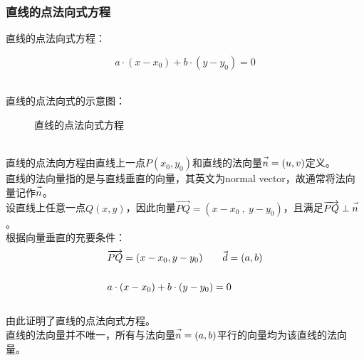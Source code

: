 \documentclass[UTF8]{ctexart}
\let\nvec\vec
\def\vec#1{\nvec{\vphantom b\smash{#1}}}
\begin{document}
\subsubsection{直线的点法向式方程}
    \setcounter{equation}{0}
    直线的点法向式方程：
    \begin{large}
        \begin{equation*}
            a\cdot(x-x_0)+b\cdot(y-y_0)=0
        \end{equation*}
    \end{large}\\
    直线的点法向式的示意图：
    \begin{figure}[h]
        \begin{center}
            \caption{直线的点法向式方程}
        \end{center}
    \end{figure}\\
    直线的点法向方程由直线上一点$P(x_0,y_0)$和直线的法向量$\vec{n}=(u,v)$定义。\\[3mm]
    直线的法向量指的是与直线垂直的向量，其英文为normal vector，故通常将法向量记作$\vec{n}$。\\[6mm]
    设直线上任意一点$Q(x,y)$，因此向量$\overrightarrow{PQ}=(x-x_0~,~y-y_0)$，且满足$\overrightarrow{PQ}\perp\vec{n}$。\\[3mm]
    根据向量垂直的充要条件：
    \begin{align}
        &\overrightarrow{PQ}=(x-x_0,y-y_0)~~~~~~\vec{d}=(a,b)\\[5mm]
        &a\cdot(x-x_0)+b\cdot(y-y_0)=0
    \end{align}\\
    由此证明了直线的点法向式方程。\\[3mm]
    直线的法向量并不唯一，所有与法向量$\vec{n}=(a,b)$平行的向量均为该直线的法向量。
\end{document}
